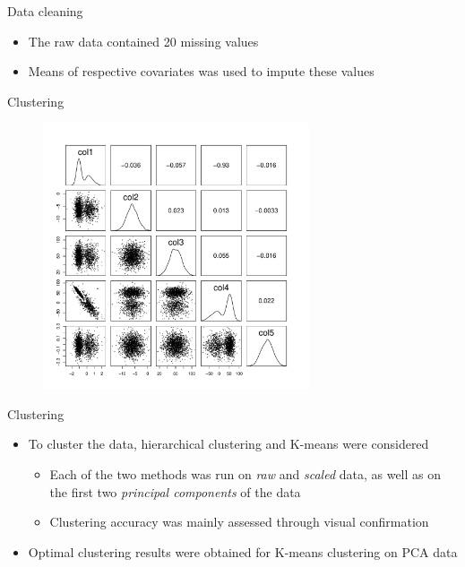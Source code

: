 \documentclass{beamer}
\let\OldTextit\textit
\renewcommand{\textit}[1]{\OldTextit{{\textcolor{islrgreen}{#1}}}}
\begin{document}
\begin{frame}{Data cleaning}
  \begin{itemize}
    \item The raw data contained 20 missing values
    \item Means of respective covariates was used to impute these values
  \end{itemize}
\end{frame}

\begin{frame}{Clustering}
  \begin{figure}
    \begin{center}
      \includegraphics[width=0.7\textwidth]{pair_plot_synthetic.pdf}
    \end{center}
  \end{figure}
\end{frame}

\begin{frame}{Clustering}
  \begin{itemize}
    \item To cluster the data, hierarchical clustering and K-means were
      considered
      \begin{itemize}
        \item Each of the two methods was run on \textit{raw} and 
          \textit{scaled} data, as well as on the first two \textit{principal
          components} of the data
        \item Clustering accuracy was mainly assessed through visual 
          confirmation
      \end{itemize}
    \item Optimal clustering results were obtained for K-means clustering on
      PCA data
  \end{itemize}
\end{frame}
\end{document}
